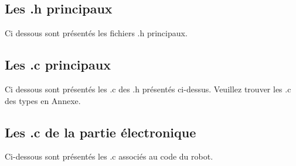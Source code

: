     \subsection{Les .h principaux}
        Ci dessous sont présentés les fichiers .h principaux.
        
   	
    	
    	
    	
        \vspace{2mm}

    \subsection{Les .c principaux}
        Ci dessous sont présentés les .c des .h présentés ci-dessus. Veuillez trouver les .c des types en Annexe.
        
        
        
        
        
        
        
        
        \vspace{2mm}

   \subsection{Les .c de la partie électronique}
        Ci-dessous sont présentés les .c associés au code du robot.
        
        
        
        
        
        
        

